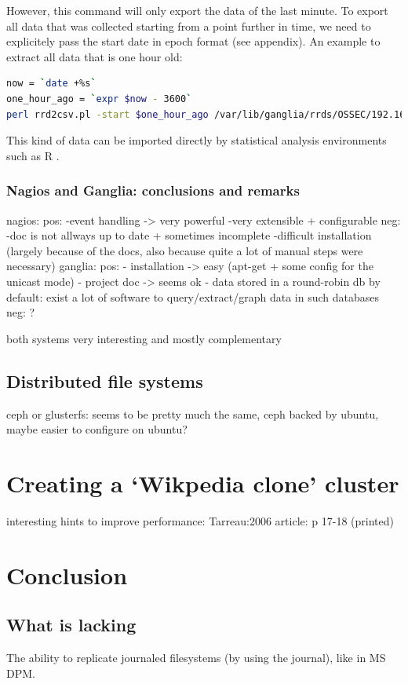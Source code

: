\documentclass[12pt]{report}
\begin{document}
However, this command will only export the data of the last minute. To
export all data that was collected starting from a point further in time, we need to
explicitely pass the start date in epoch format (see appendix).
An example to extract all data that is one hour old:
\begin{lstlisting}[language=bash]
now = `date +%s`
one_hour_ago = `expr $now - 3600` 
perl rrd2csv.pl -start $one_hour_ago /var/lib/ganglia/rrds/OSSEC/192.168.15.4/cpu\_user.rrd > node1_cpu_user.csv
\end{lstlisting} 

This kind of data can be imported directly by statistical analysis
environments such as R \cite{r_software}.

\subsection{Nagios and Ganglia: conclusions and remarks}
nagios:
pos: 
-event handling -> very powerful
-very extensible + configurable
neg:
-doc is not allways up to date + sometimes incomplete
-difficult installation (largely because of the docs, also because
quite a lot of manual steps were necessary)
ganglia:
pos:
- installation -> easy (apt-get + some config for the unicast mode)
- project doc -> seems ok
- data stored in a round-robin db by default: exist a lot of software
to query/extract/graph data in such databases
neg:
?

both systems very interesting and mostly complementary

\section{Distributed file systems}

ceph or glusterfs: seems to be pretty much the same, ceph backed by
ubuntu, maybe easier to  configure on ubuntu?

\chapter{Creating a `Wikpedia clone' cluster}
interesting hints to improve performance: Tarreau:2006 article: p
17-18 (printed)

\chapter{Conclusion} %
\section{What is lacking}
The ability to replicate journaled filesystems (by using the journal),
like in MS DPM.
\end{document}
